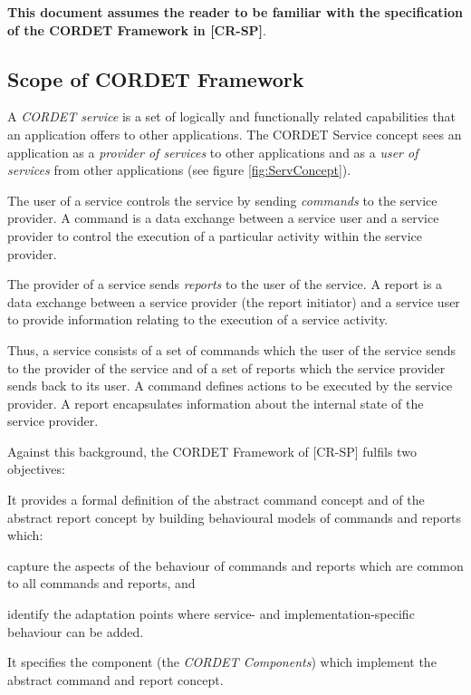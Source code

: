 \documentclass{pnp_article}
\begin{document}
\textbf{This document assumes the reader to be familiar with the specification of the CORDET Framework in [CR-SP]}. 

\subsection{Scope of CORDET Framework}\label{sec:ScopeCrFw}
A \textit{CORDET service} is a set of logically and functionally related capabilities that an application offers to other applications. The CORDET Service concept sees an application as a \textit{provider of services} to other applications and as a \textit{user of services} from other applications (see figure \ref{fig:ServConcept}).


The user of a service controls the service by sending \textit{commands} to the service provider. A command is a data exchange between a service user and a service provider to control the execution of a particular activity within the service provider. 

The provider of a service sends \textit{reports} to the user of the service. A report is a data exchange between a service provider (the report initiator) and a service user to provide information relating to the execution of a service activity.

Thus, a service consists of a set of commands which the user of the service sends to the provider of the service and of a set of reports which the service provider sends back to its user. A command defines actions to be executed by the service provider. A report encapsulates information about the internal state of the service provider.

Against this background, the CORDET Framework of [CR-SP] fulfils two objectives:

\begin{fw_itemize}
\item{} It provides a formal definition of the abstract command concept and of the abstract report concept by building behavioural models of commands and reports which:
	\begin{fw_itemize}
	\item capture the aspects of the behaviour of commands and reports which are common to all commands and reports, and
	\item identify the adaptation points where service- and implementation-specific behaviour can be added.
	\end{fw_itemize}
\item{} It specifies the component (the \textit{CORDET Components}) which implement the abstract command and report concept.
\end{fw_itemize}
\end{document}
